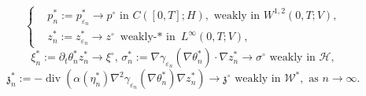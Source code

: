 \documentclass{sinst}
\numberwithin{equation}{section}
\theoremstyle{plain}
\theoremstyle{definition}
\def\sH{\mathscr{H}}
\def\sW{\mathscr{W}}
\DeclareMathOperator{\diver}{div}
\begin{document}
\begin{equation}
  \left\{ \begin{aligned}
    &p_n^* := p_{\varepsilon_n}^* \to p^\circ \mbox{ in } C([0,T];H), \mbox{ weakly in } W^{1,2}(0,T;V),
    \\
    &z_n^* := z_{\varepsilon_n}^* \to z^\circ \mbox{ weakly-$*$ in } L^\infty(0,T;V),
  \end{aligned} \right. \label{NC0_06}
\end{equation}
\begin{equation}
  \xi_n^* := \partial_t \theta_n^* z_n^* \to \xi^\circ, \, \sigma_n^* := \nabla \gamma_{\varepsilon_n}(\nabla \theta_n^*) \cdot \nabla z_n^* \to \sigma^\circ \mbox{ weakly in } \sH, \label{NC0_07}
\end{equation}
\begin{equation}
  \mathfrak{z}_n^* := -\diver(\alpha(\eta_n^*) \nabla^2 \gamma_{\varepsilon_n}(\nabla \theta_n^*) \nabla z_n^*) \to \mathfrak{z}^\circ \mbox{ weakly in } \sW^*, \mbox{ as } n \to \infty. \label{NC0_08}
\end{equation}
\end{document}
